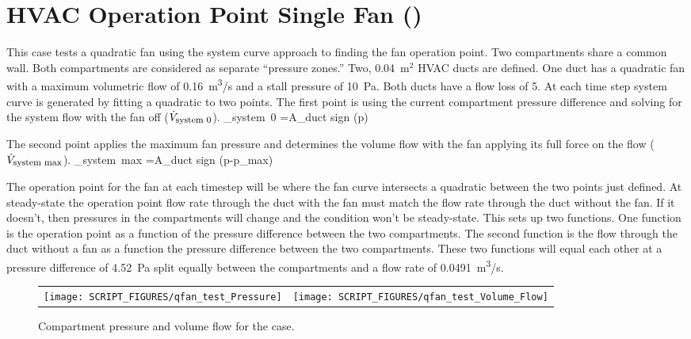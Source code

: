 \documentclass[11pt]{book}
\begin{document}
\section{HVAC Operation Point Single Fan (\texorpdfstring{}{qfan\_test})}
\label{qfan_test}

This case tests a quadratic fan using the system curve approach to finding the fan operation point. Two compartments share a common wall. Both compartments are considered as separate ``pressure zones.'' Two, 0.04~m$^2$ HVAC ducts are defined.  One duct has a quadratic fan with a maximum volumetric flow of 0.16~\si{m^3/s} and a stall pressure of 10~Pa. Both ducts have a flow loss of 5. At each time step system curve is generated by fitting a quadratic to two points. The first point is using the current compartment pressure difference and solving for the system flow with the fan off ($\dot{V}_{\hbox{\footnotesize system 0}}$).
\be
{}_{\hbox{\footnotesize system 0}} =A_{\hbox{\footnotesize duct}} \hbox{sign} (\Delta p) 
\ee

The second point applies the maximum fan pressure and determines the volume flow with the fan applying its full force on the flow ($\dot{V}_{\hbox{\footnotesize system max}}$).
\be
{}_{\hbox{\footnotesize system max}} =A_{\hbox{\footnotesize duct}} \hbox{sign} (\Delta p-\Delta p_{\hbox{\footnotesize max}}) 
\ee

The operation point for the fan at each timestep will be where the fan curve intersects a quadratic between the two points just defined. At steady-state the operation point flow rate through the duct with the fan must match the flow rate through the duct without the fan. If it doesn't, then pressures in the compartments will change and the condition won't be steady-state. This sets up two functions. One function is the operation point as a function of the pressure difference between the two compartments. The second function is the flow through the duct without a fan as a function the pressure difference between the two compartments. These two functions will equal each other at a pressure difference of 4.52~Pa split equally between the compartments and a flow rate of 0.0491~\si{m^3/s}.

\begin{figure}[ht]
    \begin{tabular*}{\textwidth}{lr}
        \texttt{[image: SCRIPT\_FIGURES/qfan\_test\_Pressure]} &
        \texttt{[image: SCRIPT\_FIGURES/qfan\_test\_Volume\_Flow]}
    \end{tabular*}
    \caption[Results of the  case]{Compartment pressure and volume flow for the  case.}
    \label{qfan_test_fig}
\end{figure}
\end{document}
